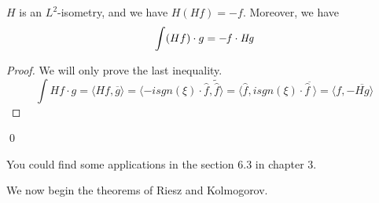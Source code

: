 \begin{proposition}
    $H$ is an $L^2$-isometry, and we have $H(Hf)=-f$. Moreover, we have
    \begin{equation*}
        \int (Hf)\cdot g=-\it f\cdot Hg
    \end{equation*}
\end{proposition}
\begin{proof}
    We will only prove the last inequality.
    \begin{equation*}
        \int Hf\cdot g=\langle Hf, \overline{g}\rangle=\langle -isgn(\xi)\cdot\hat{f},\tilde{\hat{f}}\rangle =\langle \hat{f}, isgn(\xi)\cdot\hat{f}^{\tilde{\phantom{.}}}\rangle=\langle f, -\overline{Hg}\rangle
    \end{equation*}
\end{proof}
\qed

\begin{remark}
    You could find some applications in the section 6.3 in chapter 3.
\end{remark}

We now begin the theorems of Riesz and Kolmogorov.
